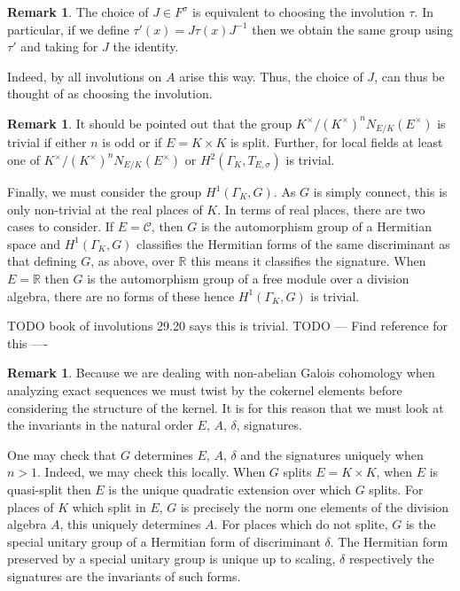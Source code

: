 \documentclass{article}
\theoremstyle{plain}
\theoremstyle{definition}
\newtheorem{remark}[theorem]{Remark}
\newcommand{\C}{\mathcal{C}}
\newcommand{\RR}{\mathbb{R}}
\newcommand{\GalKbK}{\Gamma_K}
\begin{document}
\begin{remark}
The choice of $J\in F^\sigma$ is equivalent to choosing the involution $\tau$.
In particular, if we define $\tau'(x) = J\tau(x)J^{-1}$ then we obtain the same group using $\tau'$ and taking for $J$ the identity.

Indeed, by \cite[Prop. 2.18]{The Book of Involutions TODO} all involutions on $A$ arise this way.
Thus, the choice of $J$, can thus be thought of as choosing the involution.
\end{remark}

\begin{remark}
It should be pointed out that the group $K^\times/(K^\times)^nN_{E/K}(E^\times)$ is trivial if either $n$ is odd or if $E = K\times K$ is split.
Further, for local fields at least one of $K^\times/(K^\times)^nN_{E/K}(E^\times)$ or $H^2(\GalKbK, T_{E,\sigma}) $ is trivial.
\end{remark} 

Finally, we must consider the group $H^1(\GalKbK,G)$. As $G$ is simply connect, this is only non-trivial at the real places of $K$.
In terms of real places, there are two cases to consider.
If $E=\C$, then $G$ is the automorphism group of a Hermitian space and $H^1(\GalKbK,G)$ classifies the Hermitian forms of the same discriminant as that defining $G$, as above, over $\RR$ this means it classifies the signature.
When $E=\RR$ then $G$ is the automorphism group of a free module over a division algebra, there are no forms of these hence $H^1(\GalKbK,G)$ is trivial. 

TODO book of involutions 29.20 says this is trivial.
TODO --- Find reference for this ----

\begin{remark}
Because we are dealing with non-abelian Galois cohomology when analyzing exact sequences we must twist by the cokernel elements before considering the structure of the kernel. It is for this reason that we must look at the invariants in the natural order $E$, $A$, $\delta$, signatures.
\end{remark}

One may check that $G$ determines $E$, $A$, $\delta$ and the signatures uniquely when $n>1$. Indeed, we may check this locally.
When $G$ splits $E=K\times K$, when $E$ is quasi-split then $E$ is the unique quadratic extension over which $G$ splits.
For places of $K$ which split in $E$, $G$ is precisely the norm one elements of the division algebra $A$, this uniquely determines $A$.
For places which do not splite, $G$ is the special unitary group of a Hermitian form of discriminant $\delta$.
The Hermitian form preserved by a special unitary group is unique up to scaling, $\delta$ respectively the signatures are the invariants of such forms.
\end{document}
